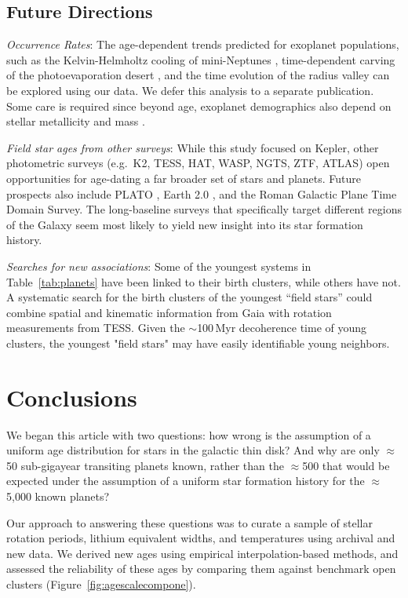 \documentclass[11pt,twocolumn,tighten]{aastex63}
\begin{document}
\subsection{Future Directions}

{\it Occurrence Rates}:
The age-dependent trends predicted for exoplanet populations, such as
the Kelvin-Helmholtz cooling of mini-Neptunes \citep{Gupta_2019},
time-dependent carving of the photoevaporation desert
\citep{Owen_Lai_2018}, and the time evolution of the radius valley
\citep{Rogers_2021} can be explored using our data.  We defer this
analysis to a separate publication.
Some care is required since beyond age,
exoplanet demographics also depend on stellar metallicity and mass
\citep[e.g.][]{Petigura_2018}.  

{\it Field star ages from other surveys}:
While this study focused on
Kepler, other photometric surveys (e.g.~K2, TESS, HAT, WASP, NGTS, ZTF,
ATLAS) open opportunities for age-dating a far broader set
of stars and planets.
Future prospects also include PLATO
\citep{Rauer14}, Earth 2.0 \citep{2022arXiv220606693G}, and the Roman
Galactic Plane Time Domain Survey.
The long-baseline surveys 
that specifically target different regions of the Galaxy
seem most likely to yield new insight into its star
formation history.

{\it Searches for new associations}:
Some of the youngest systems in Table~\ref{tab:planets} have been
linked to their birth clusters, while others have not. A systematic
search for the birth clusters of the youngest ``field stars'' could
combine spatial and kinematic information from Gaia with rotation
measurements from TESS. Given the $\sim$100\,Myr decoherence time of
young clusters, the youngest "field stars" may have easily
identifiable young neighbors.



\section{Conclusions}
\label{sec:conclusions}

We began this article with two questions: how wrong is the assumption
of a uniform age distribution for stars in the galactic thin disk?
And why are only $\approx$50 sub-gigayear transiting planets known,
rather than the $\approx$500 that would be expected under the
assumption of a uniform star formation history for the
$\approx$5{,}000 known planets?

Our approach to answering these questions was to curate a sample of
stellar rotation periods, lithium equivalent widths, and temperatures
using archival and new data.  We derived new ages using empirical
interpolation-based methods, and assessed the reliability of these ages
by comparing them against benchmark open clusters
(Figure~\ref{fig:agescalecompone}).
\end{document}
